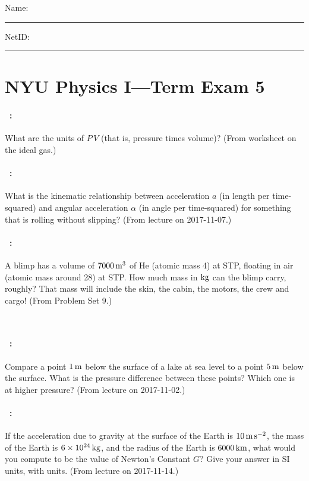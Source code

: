 \documentclass[12pt]{article} 
\begin{document}
\noindent
Name: \rule[-1ex]{0.55\textwidth}{0.1pt}
NetID: \rule[-1ex]{0.2\textwidth}{0.1pt}

\section*{NYU Physics I---Term Exam 5}

\paragraph{\problemname~\theproblem:}%
What are the units of $P\,V$ (that is, pressure times volume)?
(From worksheet on the ideal gas.)

\vfill

\paragraph{\problemname~\theproblem:}%
What is the kinematic relationship between acceleration $a$ (in length
per time-squared) and angular acceleration $\alpha$ (in angle per
time-squared) for something that is rolling without slipping?
(From lecture on 2017-11-07.)

\vfill

\paragraph{\problemname~\theproblem:}%
A blimp has a volume of $7000\,\mathrm{m}^3$ of He (atomic mass 4) at STP,
floating in air (atomic mass around 28) at STP. How much mass in $\mathrm{kg}$
can the blimp carry, roughly? That mass will include the skin, the
cabin, the motors, the crew and cargo!
(From Problem Set 9.)

\vfill
~
\clearpage

\paragraph{\problemname~\theproblem:}%
Compare a point $1\,\mathrm{m}$ below the surface of a lake at sea level to
a point $5\,\mathrm{m}$ below the surface. What is the pressure
difference between these points? Which one is at higher pressure?
(From lecture on 2017-11-02.)

\vfill

\paragraph{\problemname~\theproblem:}%
If the acceleration due to gravity at the surface of the Earth is
$10\,\mathrm{m}\,\mathrm{s}^{-2}$, the mass of the Earth is $6\times 10^{24}\,\mathrm{kg}$, and the
radius of the Earth is $6000\,\mathrm{km}$, what would you compute to be the
value of Newton's Constant $G$? Give your answer in SI units, with units.
(From lecture on 2017-11-14.)
\end{document}
